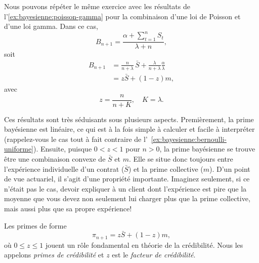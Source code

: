 Nous pouvons répéter le même exercice avec les résultats de
l'\autoref{ex:bayesienne:poisson-gamma} pour la combinaison d'une loi
de Poisson et d'une loi gamma. Dans ce cas,
\begin{equation*}
  B_{n + 1} = \frac{\alpha + \sum_{t = 1}^n S_t}{\lambda + n},
\end{equation*}
soit
\begin{align*}
  B_{n + 1}
  &= \frac{n}{n + \lambda}\, \bar{S} +
    \frac{\lambda}{n + \lambda} \frac{\alpha}{\lambda} \\
  &= z \bar{S} + (1 - z) m,
\end{align*}
avec
\begin{equation*}
  z = \frac{n}{n + K}, \quad K = \lambda.
\end{equation*}

Ces résultats sont très séduisants sous plusieurs aspects.
Premièrement, la prime bayésienne est linéaire, ce qui est à la fois
simple à calculer et facile à interpréter (rappelez-vous le cas tout à
fait contraire de l'~\autoref{ex:bayesienne:bernoulli-uniforme}).
Ensuite, puisque $0 < z < 1$ pour $n > 0$, la prime bayésienne se
trouve être une combinaison convexe de $\bar{S}$ et $m$. Elle se situe
donc toujours entre l'expérience individuelle d'un contrat ($\bar{S}$)
et la prime collective ($m$). D'un point de vue actuariel, il s'agit
d'une propriété importante. Imaginez seulement, si ce n'était pas le
cas, devoir expliquer à un client dont l'expérience est pire que la
moyenne que vous devez non seulement lui charger plus que la prime
collective, mais aussi plus que sa propre expérience!

Les primes de forme
\begin{equation*}
  \pi_{n + 1} = z \bar{S} + (1 - z) m,
\end{equation*}
où $0 \leq z \leq 1$ jouent un rôle fondamental en théorie de la
crédibilité. Nous les appelons \emph{primes de crédibilité} et $z$ est
le \emph{facteur de crédibilité}.

